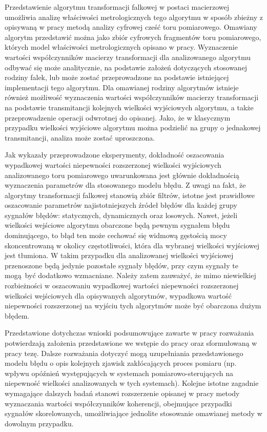 Przedstawienie algorytmu transformacji falkowej w postaci macierzowej umożliwia analizę właściwości metrologicznych tego algorytmu w sposób zbieżny z opisywaną w pracy metodą analizy cyfrowej cześć toru pomiarowego. Omawiany algorytm przedstawić można jako zbiór cyfrowych fragmentów toru pomiarowego, których model właściwości metrologicznych opisano w pracy. Wyznaczenie wartości współczynników macierzy transformacji dla analizowanego algorytmu odbywać się może analitycznie, na podstawie założeń dotyczących stosowanej rodziny falek, lub może zostać przeprowadzone na podstawie istniejącej implementacji tego algorytmu. Dla omawianej rodziny algorytmów istnieje również możliwość wyznaczenia wartości współczynników macierzy transformacji na podstawie transmitancji kolejnych wielkości wyjściowych algorytmu, a także przeprowadzenie operacji odwrotnej do opisanej. Jako, że w klasycznym przypadku wielkości wyjściowe algorytmu można podzielić na grupy o jednakowej transmitancji, analiza może zostać uproszczona.

Jak wykazały przeprowadzone eksperymenty, dokładność oszacowania wypadkowej wartości niepewności rozszerzonej wielkości wyjściowych analizowanego toru pomiarowego uwarunkowana jest głównie dokładnością wyznaczenia parametrów dla stosowanego modelu błędu. Z uwagi na fakt, że algorytmy transformacji falkowej stanowią zbiór filtrów, istotne jest prawidłowe oszacowanie parametrów najistotniejszych źródeł błędów dla każdej grupy sygnałów błędów: statycznych, dynamicznych oraz losowych. Nawet, jeżeli wielkości wejściowe algorytmu obarczone będą pewnym sygnałem błędu dominującego, to błąd ten może cechować się widmową gęstością mocy skoncentrowaną w okolicy częstotliwości, która dla wybranej wielkości wyjściowej jest tłumiona. W takim przypadku dla analizowanej wielkości wyjściowej przenoszone będą jedynie pozostałe sygnały błędów, przy czym sygnały te mogą być dodatkowo wzmacniane. Należy zatem zauważyć, że mimo niewielkiej rozbieżności w oszacowaniu wypadkowej wartości niepewności rozszerzonej wielkości wejściowych dla opisywanych algorytmów, wypadkowa wartość niepewności rozszerzonej na wyjściu tych algorytmów może być obarczona dużym błędem.

Przedstawione dotychczas wnioski podsumowujące zawarte w pracy rozważania potwierdzają założenia przedstawione we wstępie do pracy oraz sformułowaną w pracy tezę. Dalsze rozważania dotyczyć mogą uzupełniania przedstawionego modelu błędu o opis kolejnych zjawisk zakłócających proces pomiaru (np. wpływu opóźnień występujących w systemach pomiarowo-sterujących na niepewność wielkości analizowanych w tych systemach). Kolejne istotne zagadnie wymagające dalszych badań stanowi rozszerzenie opisanej w pracy metody wyznaczania wartości współczynników koherencji, obejmujące przypadki sygnałów skorelowanych, umożliwiające jednolite stosowanie omawianej metody w dowolnym przypadku.
